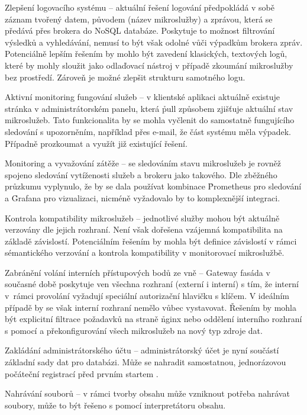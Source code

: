 \begin{dl}
   \item[Zlepšení logovacího systému] – aktuální řešení logování předpokládá v sobě záznam tvořený datem, původem (název mikroslužby) a zprávou, která se předává přes brokera do NoSQL databáze.
   Poskytuje to možnost filtrování výsledků a vyhledávání, nemusí to být však odolné vůči výpadkům brokera zpráv.
   Potenciálně lepším řešením by mohlo být zavedení klasických, textových logů, které by mohly sloužit jako odlaďovací nástroj v případě zkoumání mikroslužby bez prostředí.
   Zároveň je možné zlepšit strukturu samotného logu.
   \item[Aktivní monitoring fungování služeb] – v klientské aplikaci aktuálně existuje stránka v administrátorském panelu, která \h{pull} způsobem zjišťuje aktuální stav mikroslužeb.
   Tato funkcionalita by se mohla vyčlenit do samostatně fungujícího sledování s upozorněním, například přes e-mail, že část systému měla výpadek.
   Případně prozkoumat a využít již existující řešení.
   \item[Monitoring a vyvažování zátěže] – se sledováním stavu mikroslužeb je rovněž spojeno sledování vytíženosti služeb a brokeru jako takového.
   Dle zběžného průzkumu vyplynulo, že by se dala používat kombinace \h{Prometheus} pro sledování a \h{Grafana} pro vizualizaci, nicméně vyžadovalo by to komplexnější integraci.
   \item[Kontrola kompatibility mikroslužeb] – jednotlivé služby mohou být aktuálně verzovány dle jejich rozhraní.
   Není však dořešena vzájemná kompatibilita na základě závislostí.
   Potenciálním řešením by mohla být definice závislostí v rámci sémantického verzování a kontrola kompatibility v monitorovací mikroslužbě.
   \item[Zabránění volání interních přístupových bodů ze vně] – Gateway fasáda v současné době poskytuje ven všechna  rozhraní (externí i interní) s tím, že interní v~rámci provolání vyžadují speciální autorizační hlavičku s klíčem.
   V ideálním případě by se však interní rozhraní nemělo vůbec vystavovat.
   Řešením by mohla být explicitní filtrace požadavků na straně \h{nginx} nebo oddělení interního rozhraní s pomocí  a překonfigurování všech mikroslužeb na nový typ zdroje dat.
   \item[Zakládání administrátorského účtu] – administrátorský účet je nyní součástí základní sady dat pro databázi.
   Může se nahradit samostatnou, jednorázovou počáteční registrací před prvním startem .
   \item[Nahrávání souborů] – v rámci tvorby obsahu může vzniknout potřeba nahrávat soubory, může to být řešeno s pomocí interpretátoru obsahu.

\end{dl}
